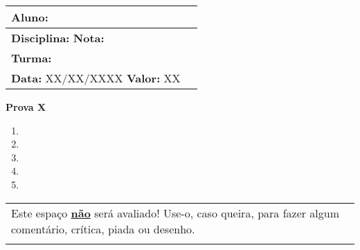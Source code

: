 \documentclass[a4paper,12pt,twoside]{report}
\begin{document}
\noindent
\begin{tabularx}{\textwidth}{|X|c|}
\hline
\multicolumn{2}{|l|}{\rule{0pt}{25pt}\textbf{Aluno:} }\\
\hline 
\textbf{Disciplina:} \hfill \textbf{Nota:} & \multirow{1}{*}{\hspace{2cm}  }\\
\cline{1-1} \textbf{Turma:}  &  \\
\cline{1-1}
\textbf{Data:} XX/XX/XXXX \hspace{2cm} \textbf{Valor:} XX &  \\
\hline
\end{tabularx}

\begin{center}
    \textbf{Prova X}
\end{center}
\vspace{-0.5cm}

\begin{enumerate}
    \item 
    \item 
    \item 
    \item
    \item
\end{enumerate}

\begin{xltabular}{\textwidth}{|X|}
\hline
Este espaço \textbf{\underline{não}} será avaliado! Use-o, caso queira, para fazer algum comentário, crítica, piada ou desenho. \vspace{3cm}\\

\\\hline
\end{xltabular}

\end{document}
